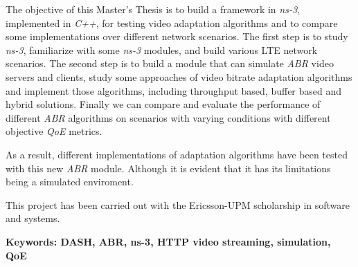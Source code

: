 The objective of this Master's Thesis is to build a framework in \textit{ns-3}, implemented
in \textit{C++}, for testing video adaptation algorithms and to compare some implementations
over different network scenarios. The first step is to study \textit{ns-3}, familiarize with
some \textit{ns-3} modules, and build various LTE network scenarios. The second step is to
build a module that can simulate \textit{ABR} video servers and clients, study some approaches
of video bitrate adaptation algorithms and implement those algorithms, including
throughput based, buffer based and hybrid solutions. Finally we can compare and 
evaluate the performance of different \textit{ABR} algorithms on scenarios with varying 
conditions with different objective \textit{QoE} metrics.

As a result, different implementations of adaptation algorithms have been tested with
this new \textit{ABR} module. Although it is evident that it has its limitations being a
simulated enviroment.

This project has been carried out with the Ericsson-UPM scholarship in software and systems.

\vfill
\textbf{Keywords: DASH, ABR, ns-3, HTTP video streaming, simulation, QoE} 